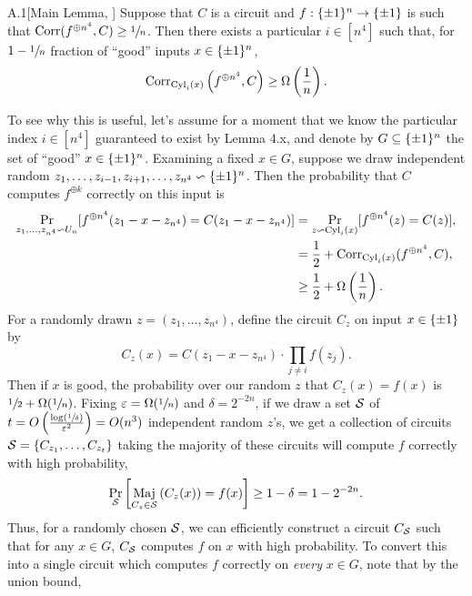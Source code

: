 \documentclass[11pt]{article}
\begin{document}
\begin{lemma}{A.1}[Main Lemma, \cite{BonehLipton}]
    Suppose that $C$ is a circuit and $f : \{\pm 1\}^n \rightarrow \{\pm 1\}$ is such that $\mathrm{Corr}(f^{\oplus n^4}, C) \geq \sfrac{1}{n}$. Then there exists a particular $i \in [n^4]$ such that, for $1 - \sfrac{1}{n}$ fraction of ``good'' inputs $x \in \{\pm 1\}^n$,
    \begin{equation*}
        \mathrm{Corr}_{\textup{Cyl}_i(x)}\left(f^{\oplus n^4}, C\right) \geq \Omega\left(\frac{1}{n}\right).
    \end{equation*}
\end{lemma}

To see why this is useful, let's assume for a moment that we know the particular index $i \in [n^4]$ guaranteed to exist by Lemma 4.x, and denote by $G \subseteq \{\pm 1\}^n$ the set of ``good'' $x \in \{\pm 1\}^n$. Examining a fixed $x \in G$, suppose we draw independent random $z_1, \ldots, z_{i - 1}, z_{i + 1}, \ldots, z_{n^4} \backsim \{\pm 1\}^n$. Then the probability that $C$ computes $f^{\oplus k}$ correctly on this input is
\begin{align*}
    \Pr_{z_1, \ldots, z_{n^4} \backsim U_n}[f^{\oplus n^4}(z_1 - x - z_{n^4}) = C(z_1 - x - z_{n^4})] & = \Pr_{z \backsim \textup{Cyl}_i(x)}[f^{\oplus n^4}(z) = C(z)], \\ & = \frac{1}{2} + \mathrm{Corr}_{\textup{Cyl}_i(x)}(f^{\oplus n^4}, C), \\ & \geq \frac{1}{2} + \Omega\left(\frac{1}{n}\right).
\end{align*}
For a randomly drawn $z = (z_1, \ldots, z_{n^4})$, define the circuit $C_z$ on input $x \in \{\pm 1\}$ by 
\begin{equation*}
    C_z(x) = C(z_1 - x - z_{n^4}) \cdot \prod_{j \neq i} f(z_j).
\end{equation*}
Then if $x$ is good, the probability over our random $z$ that $C_z(x) = f(x)$ is $\sfrac{1}{2} + \Omega(\sfrac{1}{n})$. Fixing $\varepsilon = \Omega(\sfrac{1}{n})$ and $\delta = 2^{-2n}$, if we draw a set $\mathcal{S}$  of $t = O\left(\frac{\log\left(\sfrac{1}{\delta}\right)}{\varepsilon^2}\right) = O(n^3)$ independent random $z$'s, we get a collection of circuits $\mathcal{S} = \{C_{z_1}, \ldots, C_{z_t}\}$ taking the majority of these circuits will compute $f$ correctly with high probability,
\begin{equation*}
    \Pr_{\mathcal{S}}\left[\mathop{\textup{Maj}}_{C_z \in \mathcal{S}}\left(C_z(x)\right) = f(x)\right] \geq 1 - \delta = 1 - 2^{-2n}.
\end{equation*}
Thus, for a randomly chosen $\mathcal{S}$, we can efficiently construct a circuit $C_{\mathcal{S}}$ such that for any $x \in G$, $C_{\mathcal{S}}$ computes $f$ on $x$ with high probability. To convert this into a single circuit which computes $f$ correctly on \emph{every} $x \in G$, note that by the union bound, 
\end{document}
